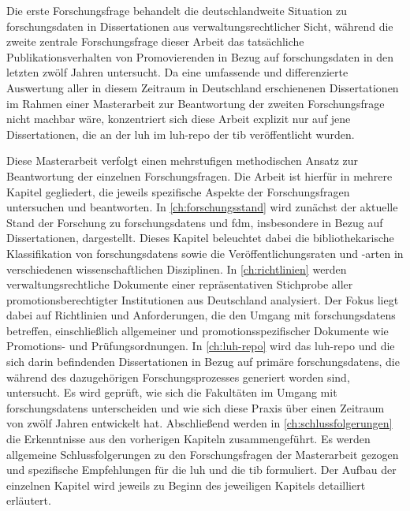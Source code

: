 Die erste Forschungsfrage behandelt die deutschlandweite Situation zu \gls{forschungsdaten} in Dissertationen aus verwaltungsrechtlicher Sicht, während die zweite zentrale Forschungsfrage dieser Arbeit das tatsächliche Publikationsverhalten von Promovierenden in Bezug auf \gls{forschungsdaten} in den letzten zwölf Jahren untersucht.
Da eine umfassende und differenzierte Auswertung aller in diesem Zeitraum in Deutschland erschienenen Dissertationen im Rahmen einer Masterarbeit zur Beantwortung der zweiten Forschungsfrage nicht machbar wäre, konzentriert sich diese Arbeit explizit nur auf jene Dissertationen, die an der \gls{luh} im \gls{luh-repo} der \gls{tib} veröffentlicht wurden.

Diese Masterarbeit verfolgt einen mehrstufigen methodischen Ansatz zur Beantwortung der einzelnen Forschungsfragen.
Die Arbeit ist hierfür in mehrere Kapitel gegliedert, die jeweils spezifische Aspekte der Forschungsfragen untersuchen und beantworten.
%
In \cref{ch:forschungsstand} wird zunächst der aktuelle Stand der Forschung zu \glspl{forschungsdaten} und \gls{fdm}, insbesondere in Bezug auf Dissertationen, dargestellt.
Dieses Kapitel beleuchtet dabei die bibliothekarische Klassifikation von \glspl{forschungsdaten} sowie die Veröffentlichungsraten und -arten in verschiedenen wissenschaftlichen Disziplinen.
%
In \cref{ch:richtlinien} werden verwaltungsrechtliche Dokumente einer repräsentativen Stichprobe aller promotionsberechtigter Institutionen aus Deutschland analysiert.
Der Fokus liegt dabei auf Richtlinien und Anforderungen, die den Umgang mit \glspl{forschungsdaten} betreffen, einschließlich allgemeiner und promotionsspezifischer Dokumente wie Promotions- und Prüfungsordnungen.
%
In \cref{ch:luh-repo} wird das \gls{luh-repo} und die sich darin befindenden Dissertationen in Bezug auf primäre \glspl{forschungsdaten}, die während des dazugehörigen Forschungsprozesses generiert worden sind, untersucht.
Es wird geprüft, wie sich die Fakultäten im Umgang mit \glspl{forschungsdaten} unterscheiden und wie sich diese Praxis über einen Zeitraum von zwölf Jahren entwickelt hat.
%
Abschließend werden in \cref{ch:schlussfolgerungen} die Erkenntnisse aus den vorherigen Kapiteln zusammengeführt.
Es werden allgemeine Schlussfolgerungen zu den Forschungsfragen der Masterarbeit gezogen und spezifische Empfehlungen für die \gls{luh} und die \gls{tib} formuliert.
%
Der Aufbau der einzelnen Kapitel wird jeweils zu Beginn des jeweiligen Kapitels detailliert erläutert.